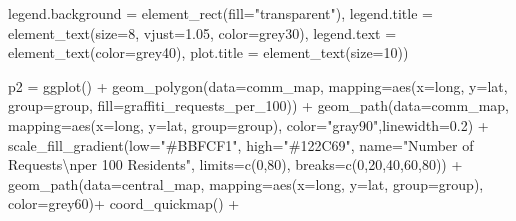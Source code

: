 \documentclass[
]{report}
\newenvironment{Shaded}{}{}
\newcommand{\AttributeTok}[1]{\textcolor[rgb]{0.65,0.15,0.64}{#1}}
\newcommand{\DecValTok}[1]{\textcolor[rgb]{0.60,0.41,0.00}{#1}}
\newcommand{\FloatTok}[1]{\textcolor[rgb]{0.60,0.41,0.00}{#1}}
\newcommand{\FunctionTok}[1]{\textcolor[rgb]{0.25,0.47,0.95}{#1}}
\newcommand{\NormalTok}[1]{\textcolor[rgb]{0.22,0.23,0.26}{#1}}
\newcommand{\OtherTok}[1]{\textcolor[rgb]{0.15,0.68,0.38}{#1}}
\newcommand{\SpecialCharTok}[1]{\textcolor[rgb]{0.00,0.52,0.74}{#1}}
\newcommand{\StringTok}[1]{\textcolor[rgb]{0.31,0.63,0.31}{#1}}
\begin{document}
\begin{Shaded}
\begin{Highlighting}[]
        \AttributeTok{legend.background =} \FunctionTok{element\_rect}\NormalTok{(}\AttributeTok{fill=}\StringTok{"transparent"}\NormalTok{),}
        \AttributeTok{legend.title =} \FunctionTok{element\_text}\NormalTok{(}\AttributeTok{size=}\DecValTok{8}\NormalTok{, }\AttributeTok{vjust=}\FloatTok{1.05}\NormalTok{, }\AttributeTok{color=}\StringTok{\textquotesingle{}grey30\textquotesingle{}}\NormalTok{),}
        \AttributeTok{legend.text =} \FunctionTok{element\_text}\NormalTok{(}\AttributeTok{color=}\StringTok{\textquotesingle{}grey40\textquotesingle{}}\NormalTok{),}
        \AttributeTok{plot.title =} \FunctionTok{element\_text}\NormalTok{(}\AttributeTok{size=}\DecValTok{10}\NormalTok{))}


\NormalTok{p2 }\OtherTok{=} \FunctionTok{ggplot}\NormalTok{() }\SpecialCharTok{+}
  \FunctionTok{geom\_polygon}\NormalTok{(}\AttributeTok{data=}\NormalTok{comm\_map, }\AttributeTok{mapping=}\FunctionTok{aes}\NormalTok{(}\AttributeTok{x=}\NormalTok{long, }\AttributeTok{y=}\NormalTok{lat, }\AttributeTok{group=}\NormalTok{group, }\AttributeTok{fill=}\NormalTok{graffiti\_requests\_per\_100)) }\SpecialCharTok{+}
  \FunctionTok{geom\_path}\NormalTok{(}\AttributeTok{data=}\NormalTok{comm\_map, }\AttributeTok{mapping=}\FunctionTok{aes}\NormalTok{(}\AttributeTok{x=}\NormalTok{long, }\AttributeTok{y=}\NormalTok{lat, }\AttributeTok{group=}\NormalTok{group), }\AttributeTok{color=}\StringTok{"gray90"}\NormalTok{,}\AttributeTok{linewidth=}\FloatTok{0.2}\NormalTok{) }\SpecialCharTok{+}
  \FunctionTok{scale\_fill\_gradient}\NormalTok{(}\AttributeTok{low=}\StringTok{"\#BBFCF1"}\NormalTok{, }\AttributeTok{high=}\StringTok{"\#122C69"}\NormalTok{,}
                      \AttributeTok{name=}\StringTok{"Number of Requests}\SpecialCharTok{\textbackslash{}n}\StringTok{per 100 Residents"}\NormalTok{,}
                      \AttributeTok{limits=}\FunctionTok{c}\NormalTok{(}\DecValTok{0}\NormalTok{,}\DecValTok{80}\NormalTok{),}
                      \AttributeTok{breaks=}\FunctionTok{c}\NormalTok{(}\DecValTok{0}\NormalTok{,}\DecValTok{20}\NormalTok{,}\DecValTok{40}\NormalTok{,}\DecValTok{60}\NormalTok{,}\DecValTok{80}\NormalTok{)) }\SpecialCharTok{+}
  \FunctionTok{geom\_path}\NormalTok{(}\AttributeTok{data=}\NormalTok{central\_map, }\AttributeTok{mapping=}\FunctionTok{aes}\NormalTok{(}\AttributeTok{x=}\NormalTok{long, }\AttributeTok{y=}\NormalTok{lat, }\AttributeTok{group=}\NormalTok{group), }\AttributeTok{color=}\StringTok{\textquotesingle{}grey60\textquotesingle{}}\NormalTok{)}\SpecialCharTok{+}
  \FunctionTok{coord\_quickmap}\NormalTok{() }\SpecialCharTok{+}

\end{Highlighting}
\end{Shaded}
\end{document}
